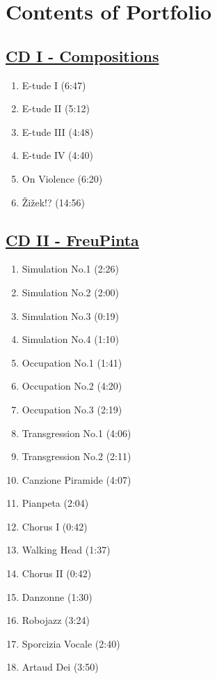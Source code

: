 \chapter*{Contents of Portfolio}
\hypertarget{portfolio}{}

\section*{\href{http://phd.federicoreuben.com/contents/audio/compositions}{CD I - Compositions}}

\begin{enumerate}
\item E-tude I (6:47)
\item E-tude II (5:12)
\item E-tude III (4:48)
\item E-tude IV (4:40)
\item On Violence (6:20)
\item \v{Z}i\v{z}ek!? (14:56)
\end{enumerate}

\section*{\href{http://phd.federicoreuben.com/contents/audio/freupinta}{CD II - FreuPinta}}

\begin{enumerate}
\item Simulation No.1 (2:26)
\item Simulation No.2 (2:00)
\item Simulation No.3 (0:19)
\item Simulation No.4 (1:10)
\item Occupation No.1 (1:41)
\item Occupation No.2 (4:20)
\item Occupation No.3 (2:19)
\item Transgression No.1 (4:06)
\item Transgression No.2 (2:11)
\item Canzione Piramide (4:07)
\item Pianpeta (2:04)
\item Chorus I (0:42)
\item Walking Head (1:37)
\item Chorus II (0:42)
\item Danzonne (1:30)
\item Robojazz (3:24)
\item Sporcizia Vocale (2:40)
\item Artaud Dei (3:50)
\end{enumerate}

